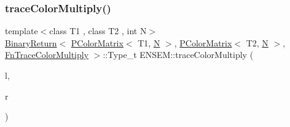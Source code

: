 \mbox{\label{group__primcolormatrix_ga690c734a59a0c81041165c0fe948ef2d}} 
\subsubsection{\texorpdfstring{traceColorMultiply()}{traceColorMultiply()}\hspace{0.1cm}{\footnotesize\ttfamily [1/3]}}
{\footnotesize\ttfamily template$<$class T1 , class T2 , int N$>$ \\
\mbox{\hyperlink{structENSEM_1_1BinaryReturn}{Binary\+Return}}$<$ \mbox{\hyperlink{classENSEM_1_1PColorMatrix}{P\+Color\+Matrix}}$<$ T1, \mbox{\hyperlink{adat__devel_2lib_2hadron_2operator__name__util_8cc_a7722c8ecbb62d99aee7ce68b1752f337}{N}} $>$, \mbox{\hyperlink{classENSEM_1_1PColorMatrix}{P\+Color\+Matrix}}$<$ T2, \mbox{\hyperlink{adat__devel_2lib_2hadron_2operator__name__util_8cc_a7722c8ecbb62d99aee7ce68b1752f337}{N}} $>$, \mbox{\hyperlink{structENSEM_1_1FnTraceColorMultiply}{Fn\+Trace\+Color\+Multiply}} $>$\+::Type\+\_\+t E\+N\+S\+E\+M\+::trace\+Color\+Multiply (\begin{DoxyParamCaption}\item[{const \mbox{\hyperlink{classENSEM_1_1PColorMatrix}{P\+Color\+Matrix}}$<$ T1, \mbox{\hyperlink{adat__devel_2lib_2hadron_2operator__name__util_8cc_a7722c8ecbb62d99aee7ce68b1752f337}{N}} $>$ \&}]{l,  }\item[{const \mbox{\hyperlink{classENSEM_1_1PColorMatrix}{P\+Color\+Matrix}}$<$ T2, \mbox{\hyperlink{adat__devel_2lib_2hadron_2operator__name__util_8cc_a7722c8ecbb62d99aee7ce68b1752f337}{N}} $>$ \&}]{r }\end{DoxyParamCaption})\hspace{0.3cm}{\ttfamily [inline]}}

\mbox{\label{group__primcolormatrix_gac1ebb50e5da5705b401fc6a361b951c5}} 
